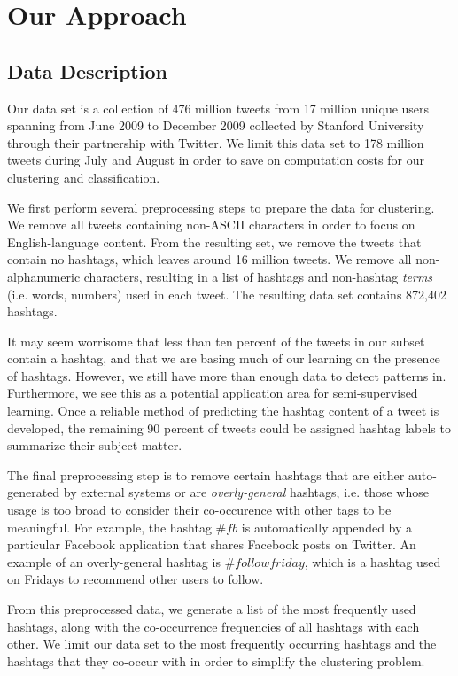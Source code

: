 

\section{Our Approach}
\subsection{Data Description}
Our data set is a collection of 476 million tweets from 17 million unique users spanning from June 2009 to December 2009 collected by Stanford University through their partnership with Twitter. We limit this data set to 178 million tweets during July and August in order to save on computation costs for our clustering and classification.

We first perform several preprocessing steps to prepare the data for clustering. We remove all tweets containing non-ASCII characters in order to focus on English-language content.  From the resulting set, we remove the tweets that contain no hashtags, which leaves around 16 million tweets. We remove all non-alphanumeric characters, resulting in a list of hashtags and non-hashtag \emph{terms} (i.e. words, numbers) used in each tweet.  The resulting data set contains 872,402 hashtags.

It may seem worrisome that less than ten percent of the tweets in our subset contain a hashtag, and that we are basing much of our learning on the presence of hashtags. However, we still have more than enough data to detect patterns in. Furthermore, we see this as a potential application area for semi-supervised learning. Once a reliable method of predicting the hashtag content of a tweet is developed, the remaining 90 percent of tweets could be assigned hashtag labels to summarize their subject matter.

The final preprocessing step is to remove certain hashtags that are either auto-generated by external systems or are \emph{overly-general} hashtags, i.e. those whose usage is too broad to consider their co-occurence with other tags to be meaningful. For example, the hashtag $\#fb$  is automatically appended by a particular Facebook application that shares Facebook posts on Twitter. An example of an overly-general hashtag is $\#followfriday$, which is a hashtag used on Fridays to recommend other users to follow.

From this preprocessed data, we generate a list of the most frequently used hashtags, along with the co-occurrence frequencies of all hashtags with each other. We limit our data set to the most frequently occurring hashtags and the hashtags that they co-occur with in order to simplify the clustering problem.

